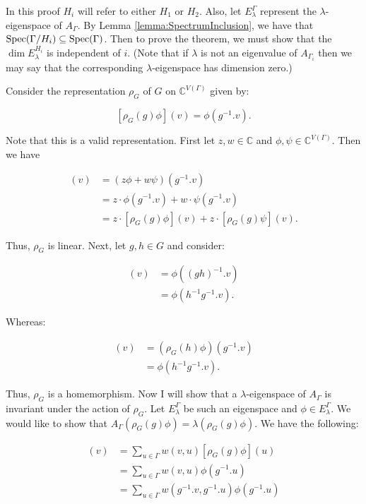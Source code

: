 In this proof $H_i$ will refer to either $H_1$ or $H_2$. Also, let $E_\lambda^{\Gamma}$ represent the $\lambda$-eigenspace of $A_\Gamma$. By Lemma \ref{lemma:SpectrumInclusion}, we have that $ \operatorname*{Spec}(\Gamma / H_i) \subseteq \operatorname*{Spec}(\Gamma) $. Then to prove the theorem, we must show that the $\operatorname{dim} E_\lambda^{H_i}$ is independent of $i$. (Note that if $\lambda$ is not an eigenvalue of $A_{\Gamma_i}$ then we may say that the corresponding $\lambda$-eigenspace has dimension zero.)

Consider the representation $\rho_G$ of $G$ on $\mathbb{C}^{V(\Gamma)}$ given by:

$$
[\rho_G(g)\phi](v) = \phi(g^{-1}.v).
$$

Note that this is a valid representation. First let $z,w \in \mathbb{C}$ and $\phi, \psi \in \mathbb{C}^{V(\Gamma)}$. Then we have

\begin{align*}
    [ \rho_G(g)(z \phi + w \psi) ](v) &= (z \phi + w \psi)(g^{-1}.v) \\
    &= z \cdot \phi(g^{-1}.v) + w \cdot \psi(g^{-1}.v) \\
    &= z \cdot [ \rho_G(g)\phi ](v) + z \cdot [ \rho_G(g)\psi ](v).
\end{align*}

Thus, $\rho_G$ is linear. Next, let $g, h \in G$ and consider:

\begin{align*}
    [ \rho_G(gh)\phi ](v) &= \phi((gh)^{-1}.v) \\
    &= \phi(h^{-1}g^{-1}.v).
\end{align*}

Whereas:

\begin{align*}
    [ (\rho_G(g) \circ \rho_G(h))\phi ](v) &= (\rho_G(h)\phi)(g^{-1}.v) \\
    &= \phi(h^{-1}g^{-1}.v).
\end{align*}

Thus, $\rho_G$ is a homemorphism. Now I will show that a $\lambda$-eigenspace of $A_\Gamma$ is invariant under the action of $\rho_G$. Let $E_{\lambda}^{\Gamma}$ be such an eigenspace and $\phi \in E_{\lambda}^{\Gamma}$. We would like to show that $A_\Gamma (\rho_G(g)\phi) = \lambda (\rho_G(g)\phi)$. We have the following:

\begin{align*}
[A_\Gamma (\rho_G(g)\phi)](v) &= \sum_{u \in \Gamma} w(v, u)[ \rho_G(g)\phi ](u) \\
&= \sum_{u \in \Gamma} w(v, u)\phi(g^{-1}.u) \\
&= \sum_{u \in \Gamma} w(g^{-1}.v, g^{-1}.u)\phi(g^{-1}.u)
\end{align*}

